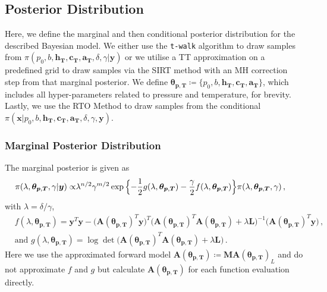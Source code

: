 \subsection{Posterior Distribution}
Here, we define the marginal and then conditional posterior distribution for the described Bayesian model.
We either use the \texttt{t-walk} algorithm \cite{christen2010general} to draw samples from $\pi(p_0,b,\bm{h_T},\bm{c_T},\bm{a_T} ,\delta, \gamma| \bm{y})$ or we utilise a TT approximation on a predefined grid to draw samples via the SIRT method with an MH correction step from that marginal posterior.
We define $\bm{\theta}_{\bm{p}, \bm{T}} \coloneqq \{p_0,b,\bm{h_T},\bm{c_T},\bm{a_T}\}$, which includes all hyper-parameters related to pressure and temperature, for brevity.
Lastly, we use the RTO Method to draw samples from the conditional $\pi(\bm{x}|p_0,b,\bm{h_T},\bm{c_T},\bm{a_T} ,\delta, \gamma, \bm{y})$.

\subsubsection{Marginal Posterior Distribution}
The marginal posterior is given as
\begin{align}
	\pi( \lambda,\bm{\theta}_{\bm{p}, \bm{T}},\gamma  | \bm{y}) \propto &  \lambda^{n/2} \gamma^{m/2}   \exp{ \Bigl\{ - \frac{1}{2} g ( \lambda,\bm{\theta}_{\bm{p}, \bm{T}}) - \frac{\gamma}{2} f ( \lambda,\bm{\theta}_{\bm{p}, \bm{T}}) \Bigr\}} \pi(\lambda,\bm{\theta}_{\bm{p}, \bm{T}},\gamma ) \, ,
	\label{eq:MargPostFull}
\end{align}
with $\lambda= \delta / \gamma$,
\begin{subequations}
	\label{eq:fandg}
	\begin{align}
		&f ( \lambda,\bm{\theta}_{\bm{p}, \bm{T}}) = \bm{y}^T \bm{y} - \big(\bm{A}(\bm{\theta}_{\bm{p}, \bm{T}})^T \bm{y}\big)^T \big(\bm{A}(\bm{\theta}_{\bm{p}, \bm{T}})^T  \bm{A}(\bm{\theta}_{\bm{p}, \bm{T}}) + \lambda \bm{L}\big)^{-1} \big(\bm{A}(\bm{\theta}_{\bm{p}, \bm{T}})^T \bm{y}\big)  \label{eq:fAppl} \, ,  \\
		&\text{and } g(\lambda,\bm{\theta}_{\bm{p}, \bm{T}}) = \log \det \big(\bm{A}(\bm{\theta}_{\bm{p}, \bm{T}})^T  \bm{A}(\bm{\theta}_{\bm{p}, \bm{T}}) + \lambda \bm{L}\big) \label{eq:gAppl} \, .
	\end{align}
\end{subequations}
Here we use the approximated forward model $\bm{A}(\bm{\theta}_{\bm{p}, \bm{T}}) \coloneqq \bm{M}\bm{A}(\bm{\theta}_{\bm{p}, \bm{T}})_L$ and do not approximate $f$ and $g$ but calculate $\bm{A}(\bm{\theta}_{\bm{p}, \bm{T}})$ for each function evaluation directly.


